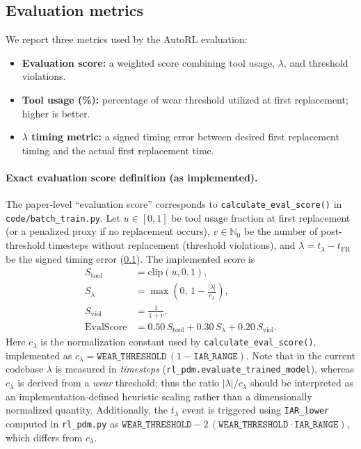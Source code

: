 \documentclass[11pt]{article}
\begin{document}
\subsection{Evaluation metrics}
\label{sec:metrics}
We report three metrics used by the AutoRL evaluation:
\begin{itemize}
	\item \textbf{Evaluation score:} a weighted score combining tool usage, $\lambda$, and threshold violations.
	\item \textbf{Tool usage (\%):} percentage of wear threshold utilized at first replacement; higher is better.
	\item \textbf{$\lambda$ timing metric:} a signed timing error between desired first replacement timing and the actual first replacement time.
\end{itemize}

\paragraph{Exact evaluation score definition (as implemented).}
The paper-level ``evaluation score'' corresponds to \texttt{calculate\_eval\_score()} in \texttt{code/batch\_train.py}. Let $u\in[0,1]$ be tool usage fraction at first replacement (or a penalized proxy if no replacement occurs), $v\in\mathbb{N}_0$ be the number of post-threshold timesteps without replacement (threshold violations), and $\lambda=t_{\lambda}-t_{\mathrm{FR}}$ be the signed timing error (\cref{sec:metrics}). The implemented score is
\begin{align}
S_{\text{tool}} &= \mathrm{clip}(u,0,1),\\
S_{\lambda} &= \max\left(0,\,1-\frac{|\lambda|}{c_{\lambda}}\right),\\
S_{\text{viol}} &= \frac{1}{1+v},\\
\mathrm{EvalScore} &= 0.50\,S_{\text{tool}} + 0.30\,S_{\lambda} + 0.20\,S_{\text{viol}}.
\end{align}
Here $c_{\lambda}$ is the normalization constant used by \texttt{calculate\_eval\_score()}, implemented as $c_{\lambda}=\texttt{WEAR\_THRESHOLD}\,(1-\texttt{IAR\_RANGE})$. Note that in the current codebase $\lambda$ is measured in \emph{timesteps} (\texttt{rl\_pdm.evaluate\_trained\_model}), whereas $c_{\lambda}$ is derived from a \emph{wear} threshold; thus the ratio $|\lambda|/c_{\lambda}$ should be interpreted as an implementation-defined heuristic scaling rather than a dimensionally normalized quantity. Additionally, the $t_{\lambda}$ event is triggered using \texttt{IAR\_lower} computed in \texttt{rl\_pdm.py} as $\texttt{WEAR\_THRESHOLD}-2\,(\texttt{WEAR\_THRESHOLD}\cdot\texttt{IAR\_RANGE})$, which differs from $c_{\lambda}$.
\end{document}
